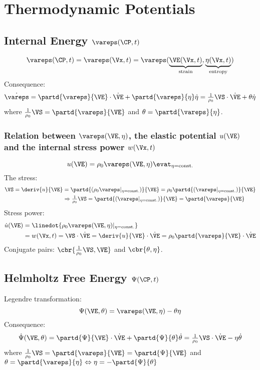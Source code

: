 \documentclass[a5paper,twosided,11pt,DIV=15,BCOR=0mm]{scrbook}
\newcommand{\veps}{\vareps}
\newcommand{\rhoz}{\tfrac{1}{\rho_0}}
\begin{document}
\section{Thermodynamic Potentials}
%
\subsection{Internal Energy $\veps(\CP,t)$}
\begin{equation}
  \veps(\CP,t) = \veps(\Vx,t) = \veps(
    \underbrace{\VE(\Vx,t)}_\text{strain},
    \underbrace{\eta(\Vx,t)}_\text{entropy})
\end{equation}
Consequence:
\begin{equation}
  \dot{\veps} = \partd{\veps}{\VE}\cdot\dot{\VE}
  + \partd{\veps}{\eta}\dot{\eta}
  = \rhoz\VS\cdot\dot{\VE} + \theta\dot{\eta}
\end{equation}
  where $\rhoz\VS = \partd{\veps}{\VE}$ and $\theta = \partd{\veps}{\eta}$.
\subsubsection{Relation between  $\veps(\VE,\eta)$, the elastic potential $u(\VE)$ and the
internal stress power $w(\Vx,t)$}
\begin{equation}
  u(\VE) = \rho_0 \veps(\VE,\eta)\evat_{\eta=\textrm{const.}}
\end{equation}
The stress:
\begin{align}
  \VS = \deriv{u}{\VE} &= \partd{(\rho_0\veps|_{\eta=\textrm{const.}})}{\VE} =
  \rho_0\partd{(\veps|_{\eta=\textrm{const.}})}{\VE}\\
  &\Rightarrow \rhoz\VS = \partd{(\veps|_{\eta=\textrm{const.}})}{\VE} = \partd{\veps}{\VE}
\end{align}
Stress power:
\begin{align}
\dot{u}(\VE) &= \linedot{\rho_0 \veps(\VE,\eta)|_{\eta=\textrm{const.}}} \\
& = w(\Vx,t) = \VS\cdot\dot{\VE} = \deriv{u}{\VE}\cdot\dot{\VE}
  = \rho_0\partd{\veps}{\VE}\cdot\dot{\VE}
\end{align}
Conjugate pairs: $\cbr{\rhoz\VS,\VE}$ and $\cbr{\theta, \eta}$.
%
\subsection{Helmholtz Free Energy $\Psi(\CP,t)$}
Legendre transformation:
\begin{equation}
  \Psi(\VE,\theta) = \veps(\VE,\eta) - \theta\eta
\end{equation}
Consequence:
\begin{equation}
  \dot{\Psi}(\VE,\theta)
  = \partd{\Psi}{\VE}\cdot\dot{\VE} + \partd{\Psi}{\theta}\dot{\theta}
  = \rhoz\VS\cdot\dot{\VE} - \eta\dot{\theta}
\end{equation}
where $\rhoz\VS = \partd{\veps}{\VE}  = \partd{\Psi}{\VE}$ and
  $\theta = \partd{\veps}{\eta} \Leftrightarrow \eta = -\partd{\Psi}{\theta}$
\end{document}
